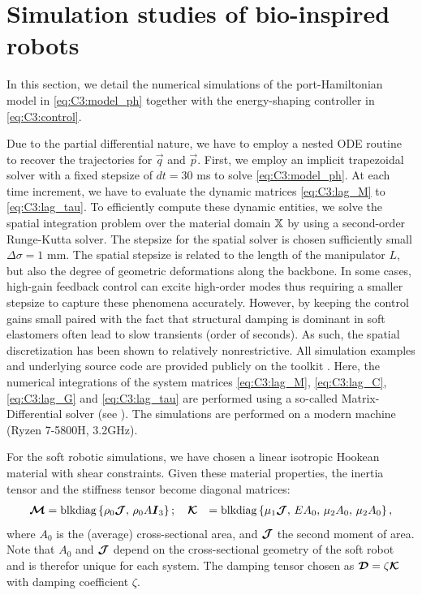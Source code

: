 \section{Simulation studies of bio-inspired robots} \label{sec:chap3_result}
In this section, we detail the numerical simulations of the port-Hamiltonian model in \eqref{eq:C3:model_ph} together with the energy-shaping controller in \eqref{eq:C3:control}. 

Due to the partial differential nature, we have to employ a nested ODE routine to recover the trajectories for $\vec{q}$ and $\vec{p}$. First, we employ an implicit trapezoidal solver with a fixed stepsize of $dt = 30 $ ms to solve \eqref{eq:C3:model_ph}. At each time increment, we have to evaluate the dynamic matrices \eqref{eq:C3:lag_M} to \eqref{eq:C3:lag_tau}. To efficiently compute these dynamic entities, we solve the spatial integration problem over the material domain $\mathbb{X}$ by using a second-order Runge-Kutta solver.  The stepsize for the spatial solver is chosen sufficiently small $\Delta \sigma = 1$ mm. The spatial stepsize is related to the length of the manipulator $L$, but also the degree of geometric deformations along the backbone. In some cases, high-gain feedback control can excite high-order modes thus requiring a smaller stepsize to capture these phenomena accurately. However, by keeping the control gains small paired with the fact that structural damping is dominant in soft elastomers often lead to slow transients (order of seconds). As such, the spatial discretization has been shown to relatively nonrestrictive. %
All simulation examples and underlying source code are provided publicly on the \sorotoki toolkit \cite{Caasenbrood2020}. Here, the numerical integrations of the system matrices \eqref{eq:C3:lag_M}, \eqref{eq:C3:lag_C}, \eqref{eq:C3:lag_G} and \eqref{eq:C3:lag_tau} are performed using a so-called Matrix-Differential solver (see \cite{Caasenbrood2022}). The simulations are performed on a modern machine (Ryzen 7-5800H, 3.2GHz).

For the soft robotic simulations, we have chosen a linear isotropic Hookean material with shear constraints. %
Given these material properties, the inertia tensor and the stiffness tensor become diagonal matrices:
%
\begin{align*}
\boldsymbol{\mathcal{M}} & = \textnormal{blkdiag}\left\{ { \rho_0 \boldsymbol{\mathcal{J}},\, \rho_0 A \boldsymbol{I}_3} \right\}; \quad 
\boldsymbol{\mathcal{K}} & = \textnormal{blkdiag}\left\{ {\mu_1 \boldsymbol{\mathcal{J}},\, E A_0,\, \mu_2  A_0,\,\mu_2  A_0} \right\},
\end{align*}
%
 where $A_0$ is the (average) cross-sectional area, and $\boldsymbol{\mathcal{J}}$ the second moment of area. Note that $A_0$ and $\boldsymbol{\mathcal{J}}$ depend on the cross-sectional geometry of the soft robot and is therefor unique for each system.  The damping tensor chosen as $\boldsymbol{\mathcal{D}} = \zeta \boldsymbol{\mathcal{K}}$ with damping coefficient $\zeta$. %

